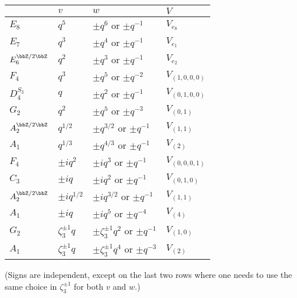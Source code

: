 \documentclass[12pt]{amsart}
\begin{document}
\begin{center}
\begin{tabular}{llll}
 & $v$ & $w$ & $V$ \\
\midrule
\midrule
$E_8$              & $q^5$              & $\pm q^6$ or $\pm q^{-1}$                & $V_{e_8}$       \\
$E_7$              & $q^3$              & $\pm q^4$ or $\pm q^{-1}$                & $V_{e_1}$       \\
$E_6^{\bbZ/2\bbZ}$ & $q^2$              & $\pm q^3$ or $\pm q^{-1}$                & $V_{e_2}$       \\
$F_4$              & $q^3$              & $\pm q^5$ or $\pm q^{-2}$                & $V_{(1,0,0,0)}$ \\
$D_4^{S_3}$        & $q  $              & $\pm q^2$ or $\pm q^{-1}$                & $V_{(0,1,0,0)}$ \\
$G_2$              & $q^2$              & $\pm q^5$ or $\pm q^{-3}$                & $V_{(0,1)}$     \\
$A_2^{\bbZ/2\bbZ}$ & $q^{1/2}$          & $\pm q^{3/2}$ or $\pm q^{-1}$            & $V_{(1,1)}$     \\
$A_1$              & $q^{1/3}$          & $\pm q^{4/3}$ or $\pm q^{-1}$            & $V_{(2)}$       \\
\midrule
$F_4$              & $\pm i q^2$        & $\pm i q^3$ or $\pm q^{-1}$              & $V_{(0,0,0,1)}$ \\
$C_3$              & $\pm i q$          & $\pm i q^2$ or $\pm q^{-1}$              & $V_{(0,1,0)}$   \\
$A_2^{\bbZ/2\bbZ}$ & $\pm i q^{1/2}$    & $\pm i q^{3/2}$ or $\pm q^{-1}$          & $V_{(1,1)}$     \\
$A_1$              & $\pm i q$          & $\pm i q^5$ or $\pm q^{-4}$              & $V_{(4)}$       \\
\midrule
$G_2$              & $\zeta_3^{\pm1} q$ & $\pm \zeta_3^{\pm1} q^2$ or $\pm q^{-1}$ & $V_{(1,0)}$     \\
$A_1$              & $\zeta_3^{\pm1} q$ & $\pm \zeta_3^{\pm1} q^4$ or $\pm q^{-3}$ & $V_{(2)}$       \\
\bottomrule
\end{tabular}
\end{center}
(Signs are independent, except on the last two rows where one needs to use the same choice in $\zeta_3^{\pm1}$ for both $v$ and $w$.)
\end{document}
